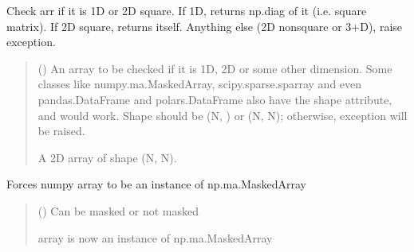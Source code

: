 \documentclass[letterpaper,10pt,english]{sphinxmanual}
\begin{document}

\begin{fulllineitems}
\label{\detokenize{misc:glomar_gridding.utils.make_square}}
\pysigstartsignatures
\pysiglinewithargsret
{}
{}
{}
\pysigstopsignatures
\sphinxAtStartPar
Check arr if it is 1D or 2D square.
If 1D, returns np.diag of it (i.e. square matrix).
If 2D square, returns itself.
Anything else (2D non\sphinxhyphen{}square or 3+D), raise exception.
\begin{quote}\begin{description}
\sphinxAtStartPar
{} () \textendash{} An array to be checked if it is 1D, 2D or some other dimension.
Some classes like numpy.ma.MaskedArray, scipy.sparse.sparray and even
pandas.DataFrame and polars.DataFrame also have the shape attribute,
and would work. Shape should be (N, ) or (N, N); otherwise, exception
will be raised.

\sphinxAtStartPar
A 2D array of shape (N, N).

\sphinxAtStartPar
{}

\end{description}\end{quote}

\end{fulllineitems}


\begin{fulllineitems}
\label{\detokenize{misc:glomar_gridding.utils.mask_array}}
\pysigstartsignatures
\pysiglinewithargsret
{}
{}
{}
\pysigstopsignatures
\sphinxAtStartPar
Forces numpy array to be an instance of np.ma.MaskedArray
\begin{quote}\begin{description}
\sphinxAtStartPar
{} () \textendash{} Can be masked or not masked

\sphinxAtStartPar
{} \textendash{} array is now an instance of np.ma.MaskedArray

\sphinxAtStartPar
{}

\end{description}\end{quote}

\end{fulllineitems}
\end{document}
